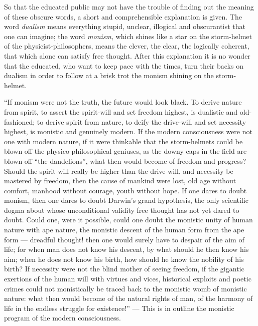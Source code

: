 \documentclass[12pt,a4paper,openany]{book}
\newcommand{\opage}[1]{\marginnote{\footnotesize\textit{[#1]}}}
\begin{document}
So that the educated public may not have
the trouble of finding out the meaning of these obscure
words, a short and comprehensible explanation is given. The word
\emph{dualism} means everything stupid, unclear, illogical
and obscurantist that one can imagine; the word \emph{monism},
which shines like a star on the storm-helmet of the physicist-philosophers,
means the clever, the clear, the logically
coherent, that which alone can satisfy
free thought. After this explanation it is no wonder
that the educated, who want to keep pace with the times,
turn their backs on dualism in order to follow at a brisk trot the monism
shining on the storm-helmet.

``If monism were not the truth, the future would look
black. To derive nature from spirit,
to assert the spirit-will and set freedom highest, is dualistic
and old-fashioned; to derive spirit from nature,
to deify the drive-will and set necessity highest,
is monistic and genuinely modern. If the modern
consciousness were not one with modern nature, if
it were thinkable that the storm-helmets could be blown off
\setcounter{footnote}{0}%
\opage{65}the physico-philosophical geniuses, as the downy caps
in the field are blown off ``the dandelions'', what then
would become of freedom and progress? Should the spirit-will
really be higher than the drive-will, and necessity
be mastered by freedom, then the cause of mankind
were lost, old age without comfort, manhood
without courage, youth without hope. If one dares
to doubt monism, then one dares to doubt
Darwin's grand hypothesis, the only scientific
dogma about whose unconditional validity
free thought has not yet dared to doubt. Could
one, were it possible, could one doubt the monistic unity
of human nature with ape nature, the monistic descent
of the human form from the ape form --- dreadful
thought! then one would surely have to despair of the aim of life;
for when man does not know his descent,
by what should he then know his aim; when he
does not know his birth, how should he know
the nobility of his birth? If necessity were not
the blind mother of seeing freedom, if the gigantic exertions
of the human will with virtues and vices,
historical exploits and poetic crimes could not monistically
be traced back to the monistic womb of
monistic nature: what then would become
of the natural rights of man, of the harmony
of life in the endless struggle for existence!'' ---
This is in outline the monistic program of the modern consciousness.
\end{document}
